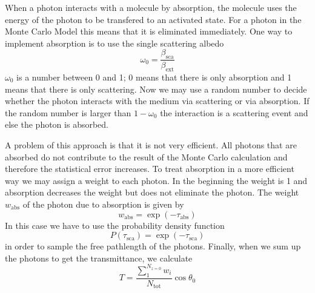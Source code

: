 \documentclass[12pt,twoside,a4paper]{article}
\begin{document}
When a photon interacts with a molecule by absorption, the molecule
uses the energy of the photon to be transfered to an activated state. For
a photon in the Monte Carlo Model this means that it
is eliminated immediately. One way to implement absorption is to
use the single scattering albedo
\begin{equation}
  \omega_0=\frac{\beta_\mathrm{sca}}{\beta_\mathrm{ext}}
\end{equation}
 $\omega_0$ is a number between 0 and 1; 0 means that
there is only absorption and 1 means that there is only
scattering. Now we may use a random number to decide whether the
photon interacts with the medium via scattering or via absorption. If
the random number is larger than $1-\omega_0$ the interaction is a
scattering event and else the photon is absorbed. 

A problem of this approach is that it is not very efficient. All
photons that are absorbed do not contribute to the result of the Monte
Carlo calculation and therefore the statistical error increases. 
To treat absorption in a  more efficient way we may assign a weight to each
photon. In the beginning the weight is 1 and absorption decreases the
weight but does not eliminate the photon. The weight $w_\mathrm{abs}$ of the photon
due to absorption is given by 
\begin{equation}
  \label{eq:weight}
  w_\mathrm{abs}=\exp(-\tau_\mathrm{abs})
\end{equation}
In this case we have to use the probability density function
\begin{equation}
   P(\tau_\mathrm{sca})=\exp(-\tau_\mathrm{sca}) 
\end{equation}
in order to sample the free pathlength of the photons.
Finally, when we sum up the photons to get the transmittance, we
calculate
\begin{equation}
  T=\frac{\sum_1^{N_{z=0}} w_i}{N_\mathrm{tot}} \cos\theta_0
\end{equation}
\end{document}
